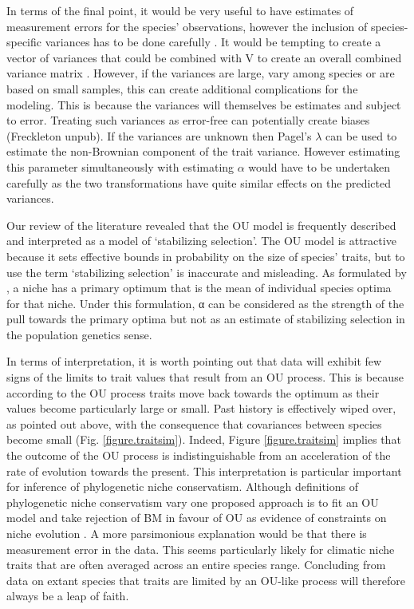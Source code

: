 \documentclass[a4paper,12pt]{article}
\begin{document}
In terms of the final point, it would be very useful to have estimates of measurement errors for the species’ observations, however the inclusion of species-specific variances has to be done carefully \citep[e.g.,][]{grafen1989phylogenetic}. It would be tempting to create a vector of variances that could be combined with V to create an overall combined variance matrix \citep{o2012evolutionary,Harmon:2010aa}. However, if the variances are large, vary among species or are based on small samples, this can create additional complications for the modeling. This is because the variances will themselves be estimates and subject to error. Treating such variances as error-free can potentially create biases (Freckleton unpub). If the variances are unknown then Pagel’s $\lambda$ \citep{Pagel:1997aa,Pagel:1999aa} can be used to estimate the non-Brownian component of the trait variance. However estimating this parameter simultaneously with estimating $\alpha$ would have to be undertaken carefully as the two transformations have quite similar effects on the predicted variances. 

Our review of the literature revealed that the OU model is frequently described and interpreted as a model of ‘stabilizing selection’. The OU model is attractive because it sets effective bounds in probability on the size of species’ traits, but to use the term ‘stabilizing selection’ is inaccurate and misleading. As formulated by \citet{hansen1997stabilizing}, a niche has a primary optimum that is the mean of individual species optima for that niche. Under this formulation, α can be considered as the strength of the pull towards the primary optima \citep{hansen2012adaptive} but not as an estimate of stabilizing selection in the population genetics sense. 

In terms of interpretation, it is worth pointing out that data will exhibit few signs of the limits to trait values that result from an OU process. This is because according to the OU process traits move back towards the optimum as their values become particularly large or small. Past history is effectively wiped over, as pointed out above, with the consequence that covariances between species become small (Fig. \ref{figure.traitsim}). Indeed, Figure \ref{figure.traitsim} implies that the outcome of the OU process is indistinguishable from an acceleration of the rate of evolution towards the present. This interpretation is particular important for inference of phylogenetic niche conservatism. Although definitions of phylogenetic niche conservatism vary \citep{Losos:2008aa,Losos:2008ab,Wiens:2008aa,crisp2012phylogenetic} one proposed approach is to fit an OU model and take rejection of BM in favour of OU as evidence of constraints on niche evolution \citep{Wiens:2010aa}. A more parsimonious explanation would be that there is measurement error in the data. This seems particularly likely for climatic niche traits that are often averaged across an entire species range. Concluding from data on extant species that traits are limited by an OU-like process will therefore always be a leap of faith. 
\end{document}
